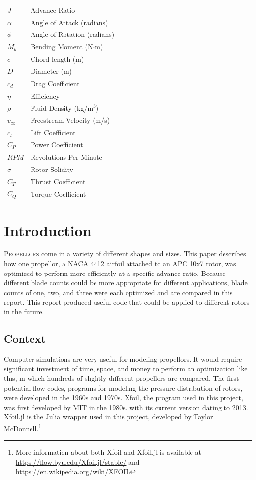 \documentclass[journal ]{new-aiaa}
\begin{document}
{\renewcommand\arraystretch{1.0}
\noindent\begin{longtable*}{@{}l @{\quad \quad} l@{}}

$J$ & Advance Ratio \\
$\alpha$ & Angle of Attack (radians) \\
$\phi$ & Angle of Rotation (radians) \\
$M_{b}$ & Bending Moment (N$\cdot$m) \\
$c$ & Chord length (m) \\
$D$ & Diameter (m) \\
$c_{d}$ & Drag Coefficient \\
$\eta$ & Efficiency \\
$\rho$ & Fluid Density (kg/m$^{3}$) \\
$v_{\infty}$ & Freestream Velocity (m/s) \\
$c_{l}$ & Lift Coefficient \\
$C_{P}$ & Power Coefficient \\
$RPM$ & Revolutions Per Minute \\
$\sigma$ & Rotor Solidity \\
$C_{T}$ & Thrust Coefficient \\
$C_{Q}$ & Torque Coefficient \\

\end{longtable*}}


\section{Introduction}

\lettrine{P}{ropellors} come in a variety of different shapes and sizes. This paper describes how one propellor, a NACA 4412 airfoil attached to an APC 10x7 rotor, was optimized to perform more efficiently at a specific advance ratio. Because different blade counts could be more appropriate for different applications, blade counts of one, two, and three were each optimized and are compared in this report. This report produced useful code that could be applied to different rotors in the future.

\subsection{Context}

Computer simulations are very useful for modeling propellors. It would require significant investment of time, space, and money to perform an optimization like this, in which hundreds of slightly different propellors are compared. The first potential-flow codes, programs for modeling the pressure distribution of rotors, were developed in the 1960s and 1970s. Xfoil, the program used in this project, was first developed by MIT in the 1980s, with its current version dating to 2013. Xfoil.jl is the Julia wrapper used in this project, developed by Taylor McDonnell.\footnote{More information about both Xfoil and Xfoil.jl is available at \url{https://flow.byu.edu/Xfoil.jl/stable/} and \url{https://en.wikipedia.org/wiki/XFOIL}}
\end{document}
